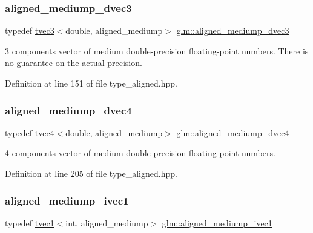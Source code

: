 \subsubsection{\texorpdfstring{aligned\_mediump\_dvec3}{aligned\_mediump\_dvec3}}
{\footnotesize\ttfamily typedef \mbox{\hyperlink{structglm_1_1tvec3}{tvec3}}$<$double, aligned\+\_\+mediump$>$ \mbox{\hyperlink{group__gtc__type__aligned_ga1ba09491d449d986ea0d63172e96a598}{glm\+::aligned\+\_\+mediump\+\_\+dvec3}}}

3 components vector of medium double-\/precision floating-\/point numbers. There is no guarantee on the actual precision. 

Definition at line 151 of file type\+\_\+aligned.\+hpp.

\mbox{\label{group__gtc__type__aligned_ga8ba1fb56271d8ffeb78283f0c3426635}} 
\subsubsection{\texorpdfstring{aligned\_mediump\_dvec4}{aligned\_mediump\_dvec4}}
{\footnotesize\ttfamily typedef \mbox{\hyperlink{structglm_1_1tvec4}{tvec4}}$<$double, aligned\+\_\+mediump$>$ \mbox{\hyperlink{group__gtc__type__aligned_ga8ba1fb56271d8ffeb78283f0c3426635}{glm\+::aligned\+\_\+mediump\+\_\+dvec4}}}



4 components vector of medium double-\/precision floating-\/point numbers. 



Definition at line 205 of file type\+\_\+aligned.\+hpp.

\mbox{\label{group__gtc__type__aligned_gaecd25bdc3dfe93926b540eff3a8a2e5c}} 
\subsubsection{\texorpdfstring{aligned\_mediump\_ivec1}{aligned\_mediump\_ivec1}}
{\footnotesize\ttfamily typedef \mbox{\hyperlink{structglm_1_1tvec1}{tvec1}}$<$int, aligned\+\_\+mediump$>$ \mbox{\hyperlink{group__gtc__type__aligned_gaecd25bdc3dfe93926b540eff3a8a2e5c}{glm\+::aligned\+\_\+mediump\+\_\+ivec1}}}



